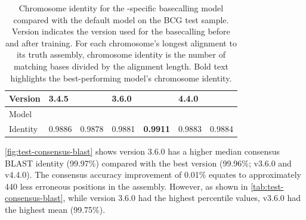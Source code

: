 \begin{table}
\centering
\begin{tabular}{@{}lllllll@{}}
\toprule
Version  & \multicolumn{2}{l}{3.4.5} & \multicolumn{2}{l}{3.6.0} & \multicolumn{2}{l}{4.4.0} \\ \midrule
Model    & \guppy{}       & \tubby{}       & \guppy{}        & \tubby{}       & \guppy{}        & \tubby{}       \\
Identity & 0.9886      & 0.9878      & 0.9881      & \textbf{0.9911}      & 0.9883      & 0.9884      \\ \bottomrule
\end{tabular}
\caption{Chromosome identity for the \mtb{}-specific basecalling model \tubby{} compared with the default \guppy{} model on the BCG test sample. Version indicates the \guppy{} version used for the basecalling before and after training. For each chromosome's longest alignment to its truth assembly, chromosome identity is the number of matching bases divided by the alignment length. Bold text highlights the best-performing model's chromosome identity.}
\label{tab:test-chrom-identity}
\end{table}

\autoref{fig:test-consensus-blast} shows \tubby{} version 3.6.0 has a higher median consensus BLAST identity (99.97\%) compared with the best \guppy{} version (99.96\%; v3.6.0 and v4.4.0). The consensus accuracy improvement of 0.01\% equates to approximately 440 less erroneous positions in the \mtb{} assembly. However, as shown in \autoref{tab:test-consensus-blast}, while \tubby{} version 3.6.0 had the highest percentile values, \guppy{} v3.6.0 had the highest mean (99.75\%).

